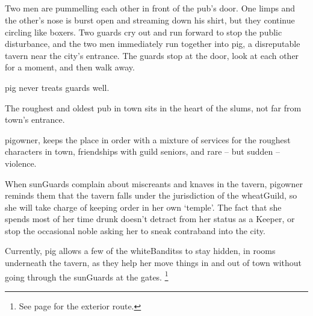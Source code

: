 \subsection{}

\begin{boxtext}

  Two men are pummelling each other in front of the pub's door.
   One limps and the other's nose is burst open and streaming down his shirt, but they continue circling like boxers.
   Two guards cry out and run forward to stop the public disturbance, and the two men immediately run together into \gls{pig}, a disreputable tavern near the city's entrance.
   The guards stop at the door, look at each other for a moment, and then walk away.

\Gls{pig} never treats \glspl{guard} well.

\end{boxtext}
 
The roughest and oldest pub in \gls{town} sits in the heart of the slums, not far from \gls{town}'s entrance.

\Gls{pigowner}, keeps the place in order with a mixture of services for the roughest characters in \gls{town}, friendships with guild seniors, and rare -- but sudden -- violence.

When \glspl{sunGuard} complain about miscreants and knaves in the tavern, \gls{pigowner} reminds them that the tavern falls under the jurisdiction of the \gls{wheatGuild}, so she will take charge of keeping order in her own `temple'.
The fact that she spends most of her time drunk doesn't detract from her status as a Keeper, or stop the occasional noble asking her to sneak contraband into the city.

Currently, \gls{pig} allows a few of the \glspl{whiteBandits} to stay hidden, in rooms underneath the tavern, as they help her move things in and out of town without going through the \glspl{sunGuard} at the gates.%
\footnote{See page \pageref{farmExit} for the exterior route.}


